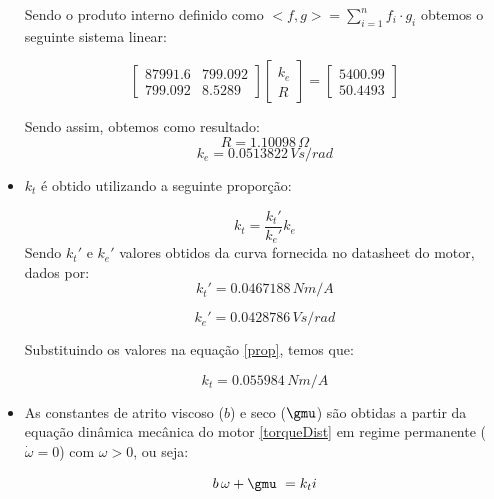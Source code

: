 \documentclass[]{politex}
\begin{document}
\begin{itemize}
Sendo o produto interno definido como $ <f,g> = \displaystyle\sum_{i=1}^n f_i \cdot g_i $ obtemos o seguinte sistema linear:

\begin{equation}
\begin{bmatrix}
87991.6 & 799.092\\
799.092 & 8.5289
\end{bmatrix}
\begin{bmatrix}
k_{e}\\
R
\end{bmatrix}= 
\begin{bmatrix}
5400.99\\
50.4493
\end{bmatrix}
\end{equation}

Sendo assim, obtemos como resultado:
\begin{equation}
R = 1.10098 \, \Omega 
\end{equation}
\begin{equation}
k_e = 0.0513822 \, V s/rad
\end{equation}

\item $k_{t}$ é obtido utilizando a seguinte proporção:

\begin{equation}
\label{prop}
k_{t} = \frac{k_{t}'}{k_{e}'} k_{e}
\end{equation}
Sendo $k_{t}'$ e $k_{e}'$ valores obtidos da curva fornecida no datasheet do motor, dados por:
\begin{equation}
k_{t}' = 0.0467188 \, N m/A
\end{equation}

\begin{equation}
k_{e}' = 0.0428786 \, V s/rad
\end{equation}

Substituindo os valores na equação \eqref{prop}, temos que:

\begin{equation}
k_t = 0.055984 \, N m/A
\end{equation}

\item As constantes de atrito viscoso ($b$) e seco ($\gmu$) são obtidas a partir da equação dinâmica mecânica do motor \eqref{torqueDist} em regime permanente ($\dot{\omega}=0$) com $\omega > 0$, ou seja: 

\begin{equation}
\label{dimMec}
b \, \omega+\gmu \ = k_{t} i
\end{equation}


\end{itemize}
\end{document}
